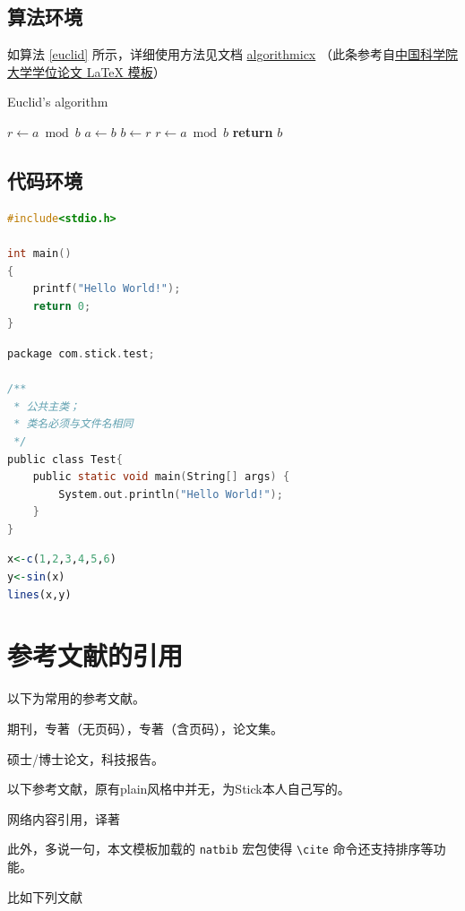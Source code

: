 \subsection{算法环境}
如算法 \ref{euclid} 所示，详细使用方法见文档 \href{https://ctan.org/pkg/algorithmicx?lang=en}{algorithmicx} （此条参考自\href{https://github.com/mohuangrui/ucasthesis}{中国科学院大学学位论文 LaTeX 模板}）
\begin{algorithm}
    \caption{Euclid’s algorithm}\label{euclid}
    \begin{algorithmic}[1]
    \State $r\gets a\bmod b$
    \State $a\gets b$
    \State $b\gets r$
    \State $r\gets a\bmod b$
    \EndWhile\label{euclidendwhile}
    \State \textbf{return} $b$
    \EndProcedure
    \end{algorithmic}
\end{algorithm}

\subsection{代码环境}

\begin{lstlisting}[language=C]
#include<stdio.h>

int main()
{
	printf("Hello World!");
	return 0;
}
\end{lstlisting}

\begin{lstlisting}[language=C,caption={Java代码},label=Code:java]
package com.stick.test;

/**
 * 公共主类；
 * 类名必须与文件名相同
 */
public class Test{
	public static void main(String[] args) {
		System.out.println("Hello World!");
	}
}
\end{lstlisting}

\begin{lstlisting}[language=R,style = nonumbers]
x<-c(1,2,3,4,5,6)
y<-sin(x)
lines(x,y)
\end{lstlisting}
\section{参考文献的引用}
以下为常用的参考文献。

期刊\cite{Art,ArtE}，专著（无页码）\cite{Boo,BooE,Boo1}，专著（含页码）\cite{InBoo,InBoo1,InBooE}，论文集\cite{Incol,IncolE}。

硕士\cite{MT}/博士论文\cite{Phd}，科技报告\cite{TechR}。

以下参考文献，原有plain风格中并无，为Stick本人自己写的。

网络内容引用\cite{Net}，译著\cite{Trans}

此外，多说一句，本文模板加载的 \verb=natbib= 宏包使得 \verb=\cite= 命令还支持排序等功能。

比如下列文献\cite{ArtE,BooE,InBooE,Trans,Net}